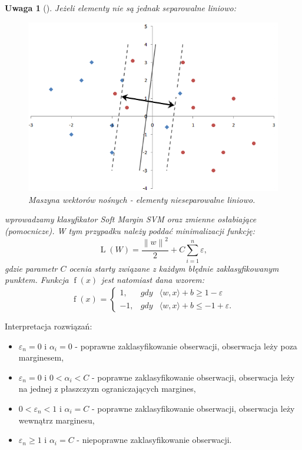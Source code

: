 \documentclass[12pt,a4paper]{report}
\newtheorem{uwaga}[df]{Uwaga}
\newcommand{\norm}[2][]{\left\| {#2} \right\|_{#1}}
\newcommand{\f}[2][]{\operatorname{f}\left( {#2} \right)_{#1}}
\newcommand{\reciprocal}[1]{\operatorname{L}\left( {#1} \right)}
\begin{document}
\begin{uwaga}[{\citep{svmmwn}}]
Jeżeli elementy nie są jednak separowalne liniowo:
\begin{center}
\begin{figure}[H]
\centering
\includegraphics[scale=0.5]{SVM2.PNG} 
\caption{Maszyna wektorów nośnych - elementy nieseparowalne liniowo.}
\end{figure}
\end{center}
wprowadzamy klasyfikator Soft Margin SVM oraz zmienne osłabiające (pomocnicze).
W tym przypadku należy poddać minimalizacji funkcję:
$$
\reciprocal{W} = \frac{\norm{w}^2}{2} + C \sum_{i=1}^n \varepsilon,
$$
gdzie parametr $C$ ocenia starty związane z każdym błędnie zaklasyfikowanym punktem.
Funkcja $\f{x}$ jest natomiast dana wzorem:
$$
\f{x} = 
\left\{\begin{array}{lll}
1, & gdy &   \langle w,x \rangle + b \geq 1 - \varepsilon \\
-1, &   gdy &   \langle w,x \rangle + b \leq -1 + \varepsilon.
\end{array} \right.
$$

\end{uwaga}

Interpretacja rozwiązań:
\begin{itemize}
\item $\varepsilon_n =0$ i $\alpha_i =0$ - poprawne zaklasyfikowanie obserwacji, obserwacja leży poza marginesem,
\item $\varepsilon_n =0$ i $0<\alpha_i <C$ - poprawne zaklasyfikowanie obserwacji, obserwacja leży na jednej z płaszczyzn ograniczających margines,
\item $0<\varepsilon_n <1$ i $\alpha_i =C$ - poprawne zaklasyfikowanie obserwacji, obserwacja leży wewnątrz marginesu,
\item $\varepsilon_n \geq 1$ i $\alpha_i =C$ - niepoprawne zaklasyfikowanie obserwacji.
\end{itemize}
\end{document}

